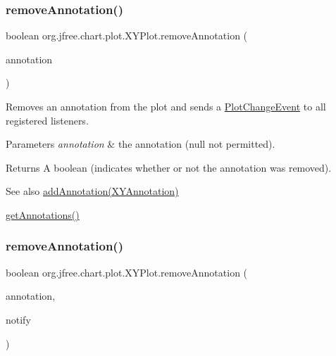 \subsubsection{\texorpdfstring{remove\+Annotation()}{removeAnnotation()}\hspace{0.1cm}{\footnotesize\ttfamily [1/2]}}
{\footnotesize\ttfamily boolean org.\+jfree.\+chart.\+plot.\+X\+Y\+Plot.\+remove\+Annotation (\begin{DoxyParamCaption}\item[{\mbox{\hyperlink{interfaceorg_1_1jfree_1_1chart_1_1annotations_1_1_x_y_annotation}{X\+Y\+Annotation}}}]{annotation }\end{DoxyParamCaption})}

Removes an annotation from the plot and sends a \mbox{\hyperlink{}{Plot\+Change\+Event}} to all registered listeners.


\begin{DoxyParams}{Parameters}
{\em annotation} & the annotation ({\ttfamily null} not permitted).\\
\hline
\end{DoxyParams}
\begin{DoxyReturn}{Returns}
A boolean (indicates whether or not the annotation was removed).
\end{DoxyReturn}
\begin{DoxySeeAlso}{See also}
\mbox{\hyperlink{classorg_1_1jfree_1_1chart_1_1plot_1_1_x_y_plot_ac4428caf611cd9954001c06db33ff779}{add\+Annotation(\+X\+Y\+Annotation)}} 

\mbox{\hyperlink{classorg_1_1jfree_1_1chart_1_1plot_1_1_x_y_plot_a65d05a1b516c28eed73f42fb7aa9f92f}{get\+Annotations()}} 
\end{DoxySeeAlso}
\mbox{\label{classorg_1_1jfree_1_1chart_1_1plot_1_1_x_y_plot_a69c28c75eb0f2c1957ce8300e6db39b8}} 
\subsubsection{\texorpdfstring{remove\+Annotation()}{removeAnnotation()}\hspace{0.1cm}{\footnotesize\ttfamily [2/2]}}
{\footnotesize\ttfamily boolean org.\+jfree.\+chart.\+plot.\+X\+Y\+Plot.\+remove\+Annotation (\begin{DoxyParamCaption}\item[{\mbox{\hyperlink{interfaceorg_1_1jfree_1_1chart_1_1annotations_1_1_x_y_annotation}{X\+Y\+Annotation}}}]{annotation,  }\item[{boolean}]{notify }\end{DoxyParamCaption})}

